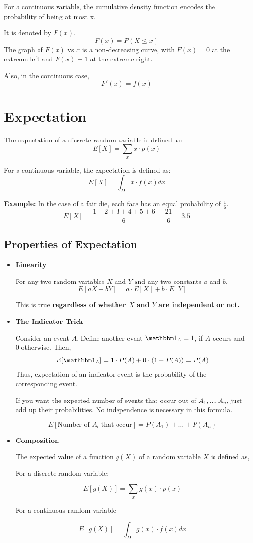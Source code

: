 \documentclass[twoside]{article}
\begin{document}
For a continuous variable, the cumulative density function encodes the probability of being at most x.

It is denoted by $F(x)$.
\[
   F(x) = P(X \leq x)
\]
The graph of $F(x)$ vs $x$ is a non-decreasing curve, with $F(x) = 0$ at the extreme left and $F(x) = 1$ at the extreme right.

Also, in the continuous case,
\[
   F'(x) = f(x)
\]

\section{Expectation}

The expectation of a discrete random variable is defined as:
\[
   E[X] = \sum_x x \cdot p(x)
\]

For a continuous variable, the expectation is defined as:
\[
   E[X] = \int_D x \cdot f(x) dx
\]

{\bf Example: } In the case of a fair die, each face has an equal probability of $\frac{1}{6}$.
\[
   E[X] = \frac{1+2+3+4+5+6}{6} = \frac{21}{6} = 3.5
\]

\subsection{Properties of Expectation}

\begin{itemize}
   \item {\bf Linearity}
   
   For any two random variables $X$ and $Y$ and any two constants $a$ and $b$,
   \[
      E[aX+bY] = a \cdot E[X] + b \cdot E[Y]
   \]

   This is true {\bf regardless of whether $X$ and $Y$ are independent or not.}

   \item {\bf The Indicator Trick}
   
   Consider an event $A$. Define another event ${\mathbbm 1_A} = 1$, if $A$ occurs and $0$ otherwise. Then,
   \[
      E[{\mathbbm 1_A}] = 1 \cdot P(A) + 0 \cdot (1 - P(A)) = P(A)
   \]
   Thus, expectation of an indicator event is the probability of the corresponding event.

   If you want the expected number of events that occur out of $A_1, \dots, A_n$, just add up their probabilities. No independence is necessary in this formula.

   \[
      E[\text{Number of $A_i$ that occur}] = P(A_1) + \dots + P(A_n)
   \]

   \item {\bf Composition}
   
   The expected value of a function $g(X)$ of a random variable $X$ is defined as,

   For a discrete random variable:

   \[
      E[g(X)] = \sum_x g(x) \cdot p(x)
   \]

   For a continuous random variable:

   \[
      E[g(X)] = \int_D g(x) \cdot f(x) dx
   \]
\end{itemize}
\end{document}
